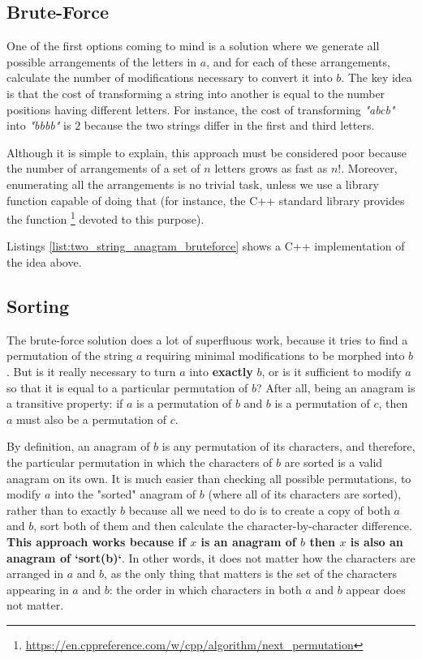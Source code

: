 \subsection{Brute-Force}
\label{sec:anagrams:bruteforce}
One of the first options coming to mind is a solution where we generate all possible arrangements of the letters in $a$, and for each of these arrangements, calculate the number of modifications necessary to convert it into $b$. 
The key idea is that the cost of transforming a string into another is equal to the number positions having different letters. 
For instance, the cost of transforming \textit{"abcb"} into \textit{"bbbb"} is $2$ because the two strings differ in the first and third letters. 

Although it is simple to explain, this approach must be considered poor because the number of arrangements of a set of $n$ letters grows as fast as $n!$.
Moreover, enumerating all the arrangements is no trivial task, unless we use a  library function capable of doing that (for instance, the C++ standard library provides the function \footnote{\href{https://en.cppreference.com/w/cpp/algorithm/next_permutation}{https://en.cppreference.com/w/cpp/algorithm/next\_permutation}} devoted to this purpose).


Listings \ref{list:two_string_anagram_bruteforce} shows a C++ implementation of the idea above.




\subsection{Sorting}
\label{sec:anagrams:sorting}
The brute-force solution does a lot of superfluous work, because it tries to find a permutation of the string $a$ requiring minimal modifications to be morphed into $b$.
But is it really necessary to turn $a$ into \textbf{exactly} $b$, or is it sufficient to modify $a$ so that it is equal to a particular permutation of $b$? 
After all, being an anagram is a transitive property: if $a$ is a permutation of $b$ and $b$ is a permutation of $c$, then $a$ must also be a permutation of $c$. 

By definition, an anagram of $b$ is any permutation of its characters, and therefore, the particular permutation in which the characters of $b$ are sorted is a valid anagram on its own. 
It is much easier than checking all possible permutations, to modify $a$ into the "sorted" anagram of $b$ (where all of its characters are sorted), rather than to exactly $b$ because all we need to do is to create a copy of both $a$ and $b$, sort both of them and then calculate the character-by-character difference.
\textbf{This approach works because if $x$ is an anagram of $b$ then $x$ is also an
anagram of `sort(b)`}.
In other words, it does not matter how the characters are arranged in $a$ and $b$, as the only thing that matters is the set of the characters
appearing in $a$ and $b$: the order in which characters in both $a$ and $b$ appear does not matter. 

